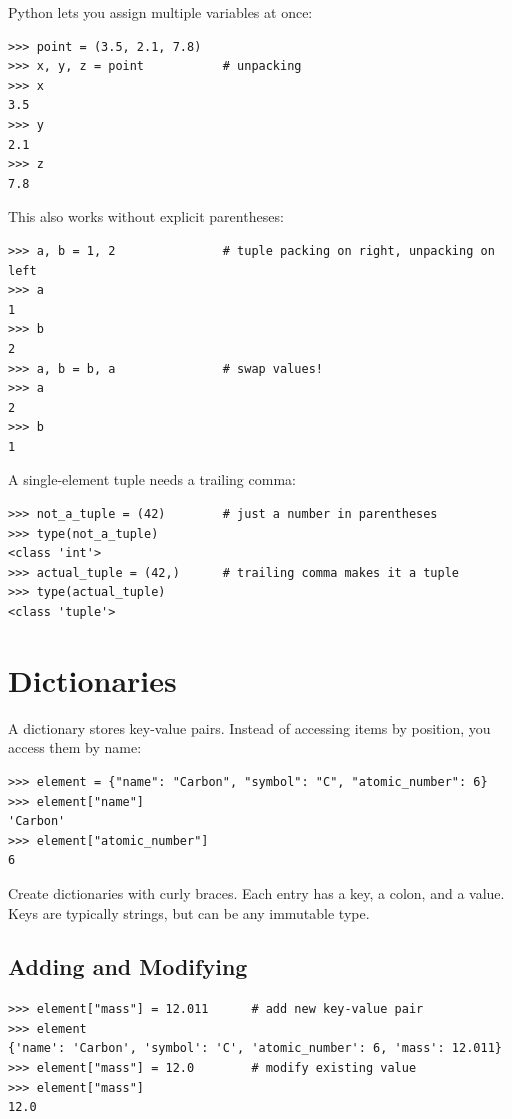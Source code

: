 Python lets you assign multiple variables at once:

\begin{lstlisting}
>>> point = (3.5, 2.1, 7.8)
>>> x, y, z = point           # unpacking
>>> x
3.5
>>> y
2.1
>>> z
7.8
\end{lstlisting}

This also works without explicit parentheses:

\begin{lstlisting}
>>> a, b = 1, 2               # tuple packing on right, unpacking on left
>>> a
1
>>> b
2
>>> a, b = b, a               # swap values!
>>> a
2
>>> b
1
\end{lstlisting}

\begin{note}
A single-element tuple needs a trailing comma:
\begin{lstlisting}
>>> not_a_tuple = (42)        # just a number in parentheses
>>> type(not_a_tuple)
<class 'int'>
>>> actual_tuple = (42,)      # trailing comma makes it a tuple
>>> type(actual_tuple)
<class 'tuple'>
\end{lstlisting}
\end{note}

\section{Dictionaries}
\label{sec:dicts}

A dictionary stores key-value pairs. Instead of accessing items by position, you access them by name:

\begin{lstlisting}
>>> element = {"name": "Carbon", "symbol": "C", "atomic_number": 6}
>>> element["name"]
'Carbon'
>>> element["atomic_number"]
6
\end{lstlisting}

Create dictionaries with curly braces. Each entry has a key, a colon, and a value. Keys are typically strings, but can be any immutable type.

\subsection{Adding and Modifying}

\begin{lstlisting}
>>> element["mass"] = 12.011      # add new key-value pair
>>> element
{'name': 'Carbon', 'symbol': 'C', 'atomic_number': 6, 'mass': 12.011}
>>> element["mass"] = 12.0        # modify existing value
>>> element["mass"]
12.0
\end{lstlisting}

